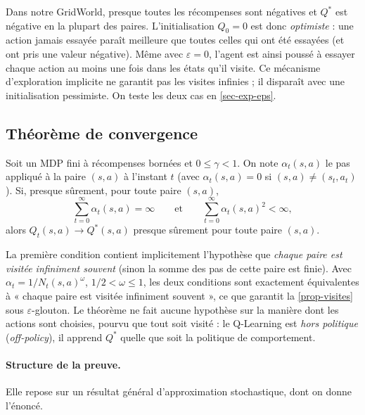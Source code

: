 \begin{remarque}\label{rem-optimisme}
Dans notre GridWorld, presque toutes les récompenses sont négatives et $Q^*$ est négative en la plupart des paires. L'initialisation $Q_0=0$ est donc \emph{optimiste} : une action jamais essayée paraît meilleure que toutes celles qui ont été essayées (et ont pris une valeur négative). Même avec $\varepsilon=0$, l'agent est ainsi poussé à essayer chaque action au moins une fois dans les états qu'il visite. Ce mécanisme d'exploration implicite ne garantit pas les visites infinies ; il disparaît avec une initialisation pessimiste. On teste les deux cas en \cref{sec-exp-eps}.
\end{remarque}

\subsection{Théorème de convergence}

\begin{theoreme}\label{thm-ql}
Soit un MDP fini à récompenses bornées et $0\le\gamma<1$. On note $\alpha_t(s,a)$ le pas appliqué à la paire $(s,a)$ à l'instant $t$ (avec $\alpha_t(s,a)=0$ si $(s,a)\neq(s_t,a_t)$). Si, presque sûrement, pour toute paire $(s,a)$,
\[
\sum_{t=0}^\infty\alpha_t(s,a)=\infty\qquad\text{et}\qquad\sum_{t=0}^\infty\alpha_t(s,a)^2<\infty,
\]
alors $Q_t(s,a)\to Q^*(s,a)$ presque sûrement pour toute paire $(s,a)$.
\end{theoreme}

La première condition contient implicitement l'hypothèse que \emph{chaque paire est visitée infiniment souvent} (sinon la somme des pas de cette paire est finie). Avec $\alpha_t=1/N_t(s,a)^\omega$, $1/2<\omega\le1$, les deux conditions sont exactement équivalentes à « chaque paire est visitée infiniment souvent », ce que garantit la \cref{prop-visites} sous $\varepsilon$-glouton. Le théorème ne fait aucune hypothèse sur la manière dont les actions sont choisies, pourvu que tout soit visité : le Q-Learning est \emph{hors politique} (\emph{off-policy}), il apprend $Q^*$ quelle que soit la politique de comportement.

\paragraph{Structure de la preuve.} Elle repose sur un résultat général d'approximation stochastique, dont on donne l'énoncé.

